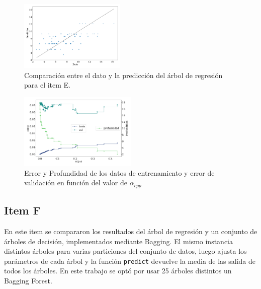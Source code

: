 \begin{figure}[H]
	\begin{small}
		\begin{center}
			\includegraphics[width=0.45\textwidth]{figures/fit_E_tree_optimo.pdf}
		\end{center}
		\caption{Comparación entre el dato y la predicción del árbol de regresión para el item E.}
		\label{fig:item_E_scatter}
	\end{small}
\end{figure}
\begin{figure}[H]
	\begin{small}
		\begin{center}
			\includegraphics[width=0.5\textwidth]{figures/params_cpp.pdf}
		\end{center}
		\caption{Error y Profundidad de los datos de entrenamiento y error de validación en función del valor de $\alpha_{cpp}$ }
		\label{fig:params_ccp}
	\end{small}
\end{figure}



\subsection*{Item F}

En este  item se compararon los resultados del árbol de regresión y un conjunto de árboles de decisión, implementados mediante Bagging. El mismo instancia distintos árboles para varias particiones del conjunto de datos, luego ajusta los parámetros de cada árbol y la función \verb|predict| devuelve la media de las salida de todos los árboles. En este trabajo se optó por usar 25 árboles distintos un Bagging Forest.

